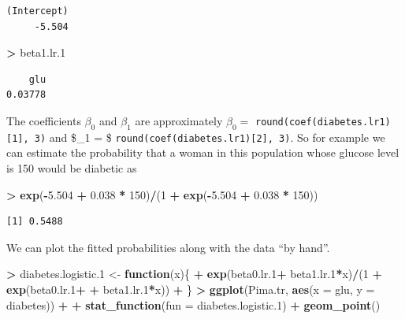 \documentclass[]{krantz}
\makeatletter
\newenvironment{Shaded}{\begin{snugshade}}{\end{snugshade}}
\newcommand{\ControlFlowTok}[1]{\textcolor[rgb]{0.27,0.27,0.27}{\textbf{#1}}}
\newcommand{\DataTypeTok}[1]{\textcolor[rgb]{0.27,0.27,0.27}{#1}}
\newcommand{\DecValTok}[1]{\textcolor[rgb]{0.06,0.06,0.06}{#1}}
\newcommand{\FloatTok}[1]{\textcolor[rgb]{0.06,0.06,0.06}{#1}}
\newcommand{\KeywordTok}[1]{\textcolor[rgb]{0.27,0.27,0.27}{\textbf{#1}}}
\newcommand{\NormalTok}[1]{#1}
\newcommand{\OperatorTok}[1]{\textcolor[rgb]{0.43,0.43,0.43}{\textbf{#1}}}
\newcommand{\StringTok}[1]{\textcolor[rgb]{0.5,0.5,0.5}{#1}}
\newenvironment{kframe}{%
\medskip{}
\setlength{\fboxsep}{.8em}
 \def\at@end@of@kframe{}%
 \ifinner\ifhmode%
  \def\at@end@of@kframe{\end{minipage}}%
  \begin{minipage}{\columnwidth}%
 \fi\fi%
 \def\FrameCommand##1{\hskip\@totalleftmargin \hskip-\fboxsep
 \colorbox{shadecolor}{##1}\hskip-\fboxsep
     \hskip-\linewidth \hskip-\@totalleftmargin \hskip\columnwidth}%
 \MakeFramed {\advance\hsize-\width
   \@totalleftmargin\z@ \linewidth\hsize
   \@setminipage}}%
 {\par\unskip\endMakeFramed%
 \at@end@of@kframe}
\renewenvironment{Shaded}{\begin{kframe}}{\end{kframe}}
\makeatother
\begin{document}
\begin{verbatim}
(Intercept) 
     -5.504 
\end{verbatim}

\begin{Shaded}
\begin{Highlighting}[]
\OperatorTok{>}\StringTok{ }\NormalTok{beta1.lr}\FloatTok{.1}
\end{Highlighting}
\end{Shaded}

\begin{verbatim}
    glu 
0.03778 
\end{verbatim}

The coefficients \(\beta_0\) and \(\beta_1\) are approximately \(\beta_0 =\) \texttt{round(coef(diabetes.lr1){[}1{]},\ 3)} and
\$\beta\_1 = \$ \texttt{round(coef(diabetes.lr1){[}2{]},\ 3)}. So for example we can estimate the probability that a woman in this population whose glucose level is 150 would be diabetic as

\begin{Shaded}
\begin{Highlighting}[]
\OperatorTok{>}\StringTok{ }\KeywordTok{exp}\NormalTok{(}\OperatorTok{-}\FloatTok{5.504} \OperatorTok{+}\StringTok{ }\FloatTok{0.038} \OperatorTok{*}\StringTok{ }\DecValTok{150}\NormalTok{)}\OperatorTok{/}\NormalTok{(}\DecValTok{1} \OperatorTok{+}\StringTok{ }\KeywordTok{exp}\NormalTok{(}\OperatorTok{-}\FloatTok{5.504} \OperatorTok{+}\StringTok{ }\FloatTok{0.038} \OperatorTok{*}\StringTok{ }\DecValTok{150}\NormalTok{))}
\end{Highlighting}
\end{Shaded}

\begin{verbatim}
[1] 0.5488
\end{verbatim}

We can plot the fitted probabilities along with the data ``by hand''.

\begin{Shaded}
\begin{Highlighting}[]
\OperatorTok{>}\StringTok{ }\NormalTok{diabetes.logistic}\FloatTok{.1}\NormalTok{ <-}\StringTok{ }\ControlFlowTok{function}\NormalTok{(x)\{}
\OperatorTok{+}\StringTok{   }\KeywordTok{exp}\NormalTok{(beta0.lr}\FloatTok{.1}\OperatorTok{+}\StringTok{ }\NormalTok{beta1.lr}\FloatTok{.1}\OperatorTok{*}\NormalTok{x)}\OperatorTok{/}\NormalTok{(}\DecValTok{1} \OperatorTok{+}\StringTok{ }\KeywordTok{exp}\NormalTok{(beta0.lr}\FloatTok{.1}\OperatorTok{+}\StringTok{ }
\OperatorTok{+}\StringTok{                                            }\NormalTok{beta1.lr}\FloatTok{.1}\OperatorTok{*}\NormalTok{x))}
\OperatorTok{+}\StringTok{ }\NormalTok{\}}
\OperatorTok{>}\StringTok{ }\KeywordTok{ggplot}\NormalTok{(Pima.tr, }\KeywordTok{aes}\NormalTok{(}\DataTypeTok{x =}\NormalTok{ glu, }\DataTypeTok{y =}\NormalTok{ diabetes)) }\OperatorTok{+}\StringTok{ }
\OperatorTok{+}\StringTok{   }\KeywordTok{stat_function}\NormalTok{(}\DataTypeTok{fun =}\NormalTok{ diabetes.logistic}\FloatTok{.1}\NormalTok{) }\OperatorTok{+}\StringTok{ }\KeywordTok{geom_point}\NormalTok{()}
\end{Highlighting}
\end{Shaded}
\end{document}
